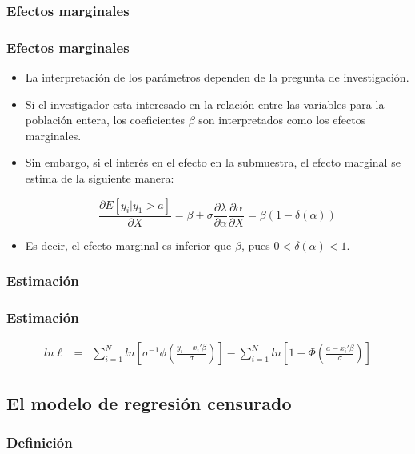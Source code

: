 \subsubsection{Efectos marginales}

\begin{frame}
	\frametitle{Efectos marginales}
	
	\begin{itemize}
		\item La interpretación de los parámetros dependen de la pregunta de
		investigación. 
		\item Si el investigador esta interesado en la relación entre las variables 
		para la población entera, los coeficientes $\beta$ son interpretados como los efectos marginales. 
		\item Sin embargo, si el interés en el efecto en la submuestra, el efecto marginal se estima de la siguiente manera:
		
		
		$$\frac{\partial E[y_i|y_1>a]}{\partial X}=\beta+\sigma
		\frac{\partial \lambda}{\partial \alpha}\frac{\partial
			\alpha}{\partial X}=\beta(1-\delta(\alpha))$$
		
		\item Es decir, el efecto marginal es inferior que $\beta$, pues $0<\delta(\alpha)<1$.
	\end{itemize}
	
\end{frame}

\subsubsection{Estimación}

\begin{frame}
	\frametitle{Estimación}
	
	\begin{eqnarray*}
		ln \ell &=& \sum_{i=1}^{N} ln \left[ \sigma^{-1} \phi \left(  \frac{y_i-x_i'\beta}{\sigma} \right)  \right]-
		\sum_{i=1}^{N} ln \left[1-\Phi \left( \frac{a-x_i'\beta}{\sigma} \right)  \right]
	\end{eqnarray*}
\end{frame}


\subsection{El modelo de regresión censurado}

\subsubsection{Definición}

